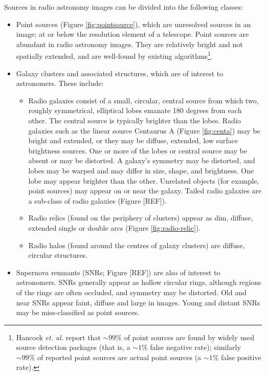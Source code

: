 Sources in radio astronomy images can be divided into the following classes:
\begin{itemize}
\item Point sources (Figure \ref{fig:pointsource}), which are unresolved sources in an image; at or below the resolution
element of a telescope. Point sources are abundant in radio astronomy images. They are relatively bright and not spatially extended, and are well-found by existing algorithms\footnote{Hancock \textit{et. al.} \cite{hancock2012compact} report that $\sim 99\%$ of point sources are found by widely used source detection packages (that is, a $\sim 1\%$ false negative rate); similarly $\sim 99\%$ of reported point sources are actual point sources (a $\sim 1\%$ false positive rate).}.
\item Galaxy clusters and associated structures, which are of interest to astronomers. These include:
	\begin{itemize}
	\item Radio galaxies consist of a small, circular, central source from which two, roughly symmetrical, elliptical lobes emanate 180 degrees from each other. The central source is typically brighter than the lobes. Radio galaxies such as the linear source Centaurus A (Figure \ref{fig:centa}) may be bright and extended, or they may be diffuse, extended, low surface brightness sources. One or more of the lobes or central source may be absent or may be distorted. A galaxy's symmetry may be distorted, and lobes may be warped and may differ in size, shape, and brightness. One lobe may appear brighter than the other. Unrelated objects (for example, point sources) may appear on or near the galaxy. Tailed radio galaxies are a sub-class of radio galaxies (Figure [REF]). 
	\item Radio relics (found on the periphery of clusters) appear as dim, diffuse, extended single or double arcs (Figure \ref{fig:radio-relic}).
        \item Radio halos (found around the centres of galaxy clusters) are diffuse, circular structures.
	\end{itemize}
\item Supernova remnants (SNRs; Figure [REF]) are also of interest to astronomers. SNRs generally appear as hollow circular rings, although regions of the rings are often occluded, and symmetry may be distorted. Old and near SNRs appear faint, diffuse and large in images. Young and distant SNRs may be miss-classified as point sources.
\end{itemize}

